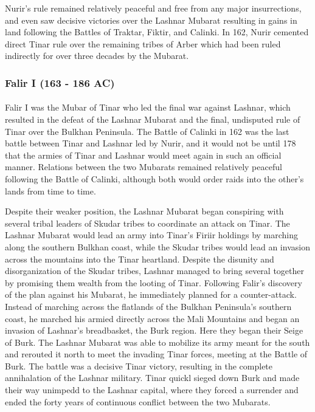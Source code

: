 					Nurir's rule remained relatively peaceful and free from any major insurrections, and even saw decisive victories over the Lashnar Mubarat resulting in gains in land following the Battles of Traktar, Fiktir, and Calinki. In 162, Nurir cemented direct Tinar rule over the remaining tribes of Arber which had been ruled indirectly for over three decades by the Mubarat.
			\subsubsection{Falir I (163 - 186 AC)}
				\paragraph{}
					Falir I was the Mubar of Tinar who led the final war against Lashnar, which resulted in the defeat of the Lashnar Mubarat and the final, undisputed rule of Tinar over the Bulkhan Peninsula. The Battle of Calinki in 162 was the last battle between Tinar and Lashnar led by Nurir, and it would not be until 178 that the armies of Tinar and Lashnar would meet again in such an official manner. Relations between the two Mubarats remained relatively peaceful following the Battle of Calinki, although both would order raids into the other's lands from time to time. 
					
					Despite their weaker position, the Lashnar Mubarat began conspiring with several tribal leaders of Skudar tribes to coordinate an attack on Tinar. The Lashnar Mubarat would lead an army into Tinar's Firiir holdings by marching along the southern Bulkhan coast, while the Skudar tribes would lead an invasion across the mountains into the Tinar heartland. Despite the disunity and disorganization of the Skudar tribes, Lashnar managed to bring several together by promising them wealth from the looting of Tinar. Following Falir's discovery of the plan against his Mubarat, he immediately planned for a counter-attack. Instead of marching across the flatlands of the Bulkhan Peninsula's southern coast, he marched his armied directly across the Mali Mountains and began an invasion of Lashnar's breadbasket, the Burk region. Here they began their Seige of Burk. The Lashnar Mubarat was able to mobilize its army meant for the south and rerouted it north to meet the invading Tinar forces, meeting at the Battle of Burk. The battle was a decisive Tinar victory, resulting in the complete annihalation of the Lashnar military. Tinar quickl sieged down Burk and made their way unimpedd to the Lashnar capital, where they forced a surrender and ended the forty years of continuous conflict between the two Mubarats.
					
